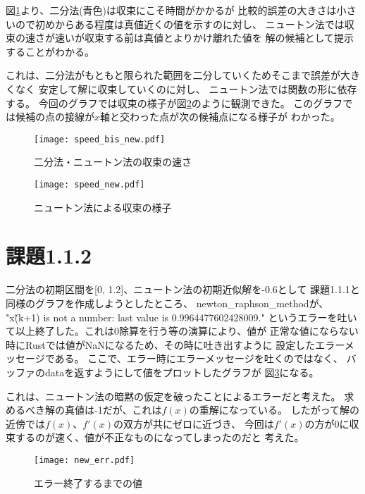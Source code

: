 \documentclass[uplatex, 11pt,a4j, titlepage]{jsarticle}
\begin{document}
図\ref{bis_new}より、二分法(青色)は収束にこそ時間がかかるが
比較的誤差の大きさは小さいので初めからある程度は真値近くの値を示すのに対し、
ニュートン法では収束の速さが速いが収束する前は真値とよりかけ離れた値を
解の候補として提示することがわかる。

これは、二分法がもともと限られた範囲を二分していくためそこまで誤差が大きくなく
安定して解に収束していくのに対し、
ニュートン法では関数の形に依存する。
今回のグラフでは収束の様子が図\ref{new}のように観測できた。
このグラフでは候補の点の接線が$x$軸と交わった点が次の候補点になる様子が
わかった。

\begin{figure}[h]
    \centering
    \texttt{[image: speed\_bis\_new.pdf]}
    \caption{二分法・ニュートン法の収束の速さ}
    \label{bis_new}
\end{figure}

\begin{figure}[h]
    \centering
    \texttt{[image: speed\_new.pdf]}
    \caption{ニュートン法による収束の様子}
    \label{new}
\end{figure}

\newpage
\newpage

\section{課題1.1.2}

二分法の初期区間を[0, 1.2]、ニュートン法の初期近似解を-0.6として
課題1.1.1と同様のグラフを作成しようとしたところ、
newton\_raphson\_methodが、
"x\^(k+1) is not a number: last value is 0.9964477602428009."
というエラーを吐いて以上終了した。これは0除算を行う等の演算により、値が
正常な値にならない時にRustでは値がNaNになるため、その時に吐き出すように
設定したエラーメッセージである。
ここで、エラー時にエラーメッセージを吐くのではなく、
バッファのdataを返すようにして値をプロットしたグラフが
図\ref{new_err}になる。

これは、ニュートン法の暗黙の仮定を破ったことによるエラーだと考えた。
求めるべき解の真値は-1だが、これは$f(x)$の重解になっている。
したがって解の近傍では$f(x)$、$f'(x)$の双方が共にゼロに近づき、
今回は$f'(x)$の方が0に収束するのが速く、値が不正なものになってしまったのだと
考えた。

\newpage
\begin{figure}[h]
    \centering
    \texttt{[image: new\_err.pdf]}
    \caption{エラー終了するまでの値}
    \label{new_err}
\end{figure}
\end{document}
